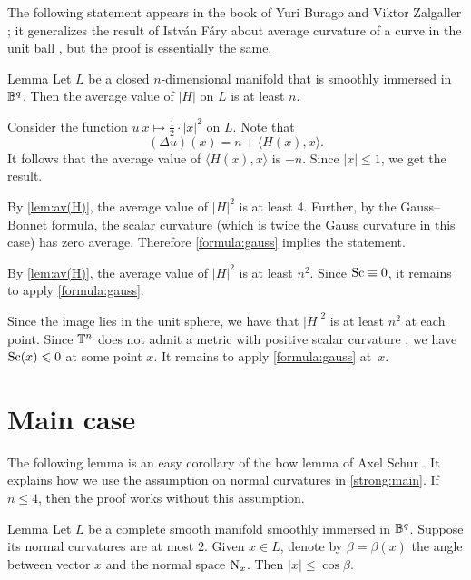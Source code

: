 \documentclass[a4paper,10pt]{article}
\begin{document}
The following statement appears in the book of Yuri Burago and Viktor Zalgaller \cite[Theorem~28.2.5]{burago-zalgaller};
it generalizes the result of István Fáry about average curvature of a curve in the unit ball \cite{fary,tabachnikov}, but the proof is essentially the same.

\begin{thm}{Lemma}\label{lem:av(H)}
Let $L$ be a closed $n$-dimensional manifold that is smoothly immersed in $\mathbb{B}^q$.
Then the average value of $|H|$ on $L$ is at least $n$.
\end{thm}

Consider the function $u\:x\mapsto \tfrac12\cdot |x|^2$ on $L$.
Note that 
\[(\Delta u)(x)=n+ \langle H(x),x\rangle.\]
It follows that the average value of $\langle H(x),x\rangle$ is $-n$.
Since $|x|\le1$, we get the result.
\qeds

By \ref{lem:av(H)}, the average value of $|H|^2$ is at least 4.
Further, by the Gauss--Bonnet formula, the scalar curvature (which is twice the Gauss curvature in this case) has zero average.
Therefore \ref{formula:gauss} implies the statement.
\qeds

By \ref{lem:av(H)},
the average value of $|H|^2$ is at least $n^2$.
Since $\mathrm{Sc}\equiv0$, it remains to apply \ref{formula:gauss}.
\qeds

Since the image lies in the unit sphere, we have that $|H|^2$ is at least $n^2$ at each point.
Since $\mathbb{T}^n$ does not admit a metric with positive scalar curvature \cite[Corollary A]{gromov-lawson}, we have $\mathrm{Sc}(x)\leqslant 0$ at some point $x$.
It remains to apply \ref{formula:gauss} at~$x$.
\qeds

\section{Main case}

The following lemma is an easy corollary of the bow lemma of Axel Schur \cite{shur,petrunin-zamora}.
It explains how we use the assumption on normal curvatures in \ref{strong:main}.
If $n\le4$, then the proof works without this assumption.

\begin{thm}{Lemma}\label{lem:trivial}
Let $L$ be a complete smooth manifold smoothly immersed in $\mathbb{B}^q$.
Suppose its normal curvatures are at most $2$.
Given $x\in L$, denote by $\beta=\beta(x)$ the angle between vector $x$ and the normal space $\mathrm{N}_x$.
Then $|x|\le \cos\beta$.
\end{thm}
\end{document}
